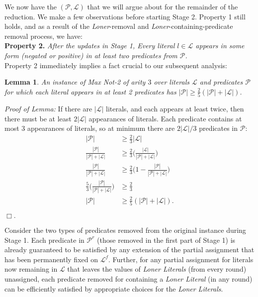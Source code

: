 \documentclass{article}
\newtheorem{lemma}[]{Lemma}
\begin{document}
We now have the $(\mathcal{P}, \mathcal{L})$ that we will argue about for the remainder of the reduction.  We make a few observations before starting Stage 2. Property 1 still holds, and as a result of the \textit{Loner}-removal and \textit{Loner}-containing-predicate removal process, we have:\\

\noindent \textbf{Property 2.} \textit{After the updates in Stage 1, Every literal $l\in \mathcal{L}$ appears in some form (negated or positive) in at least two predicates from $\mathcal{P}$.}\\

\noindent Property 2 immediately implies a fact crucial to our subsequent analysis:

\begin{lemma} \label{twofifths} An instance of \textit{Max Not-2} of arity $3$ over literals $\mathcal{L}$ and predicates $\mathcal{P}$ for which each literal appears in at least 2 predicates has $|\mathcal{P}|\geq \frac{2}{5}(|\mathcal{P}|+|\mathcal{L}|)$.
\end{lemma}

\noindent\textit{Proof of Lemma:} If there are $|\mathcal{L}|$ literals, and each appears at least twice, then there must be at least $2|\mathcal{L}|$ appearances of literals. Each predicate contains at most 3 appearances of literals, so at minimum there are $2|\mathcal{L}|/3$ predicates in $\mathcal{P}$:
\begin{align*}
|\mathcal{P}|&\geq \frac{2}{3} |\mathcal{L}|\\
\frac{|\mathcal{P}|}{|\mathcal{P}|+|\mathcal{L}|}&\geq \frac{2}{3} \Big(\frac{|\mathcal{L}|}{|\mathcal{P}|+|\mathcal{L}|}\Big)\\
\frac{|\mathcal{P}|}{|\mathcal{P}|+|\mathcal{L}|}&\geq \frac{2}{3} \Big(1-\frac{|\mathcal{P}|}{|\mathcal{P}|+|\mathcal{L}|}\Big)\\
\frac{5}{3}\Big(\frac{|\mathcal{P}|}{|\mathcal{P}|+|\mathcal{L}|}\Big)&\geq \frac{2}{3}\\
|\mathcal{P}|&\geq \frac{2}{5}(|\mathcal{P}|+|\mathcal{L}|).
\end{align*}
\begin{flushright}$\Box.$\\
\end{flushright}

Consider the two types of predicates removed from the original instance during Stage 1.  Each predicate in $\mathcal{P}^r$ (those removed in the first part of Stage 1) is already guaranteed to be satisfied by any extension of the partial assignment that has been  permanently fixed on $\mathcal{L}^f$. Further, for any partial assignment for literals now remaining in $\mathcal{L}$ that leaves the values of \textit{Loner Literals} (from every round) unassigned, 
each predicate removed for containing a \textit{Loner Literal} (in any round) can be efficiently satisfied by appropriate choices for the \textit{Loner Literals}. 
\end{document}
